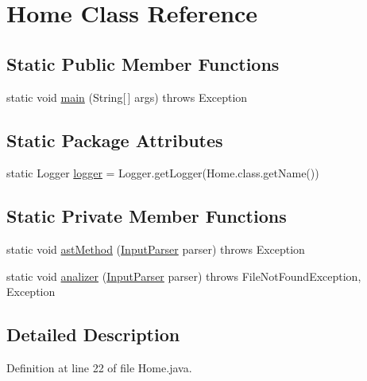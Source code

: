 \hypertarget{class_home}{\section{Home Class Reference}
\label{class_home}
}
\subsection*{Static Public Member Functions}
\begin{DoxyCompactItemize}
\item 
static void \hyperlink{class_home_a824a2d585cb36f1a452ebc5db9b49ed0}{main} (String\mbox{[}$\,$\mbox{]} args)  throws Exception
\end{DoxyCompactItemize}
\subsection*{Static Package Attributes}
\begin{DoxyCompactItemize}
\item 
static Logger \hyperlink{class_home_ac74d97ae59ddf53153a62e8790619756}{logger} = Logger.\-get\-Logger(Home.\-class.\-get\-Name())
\end{DoxyCompactItemize}
\subsection*{Static Private Member Functions}
\begin{DoxyCompactItemize}
\item 
static void \hyperlink{class_home_a6ecba75c6ecc1abdd9c75352d34a7df7}{ast\-Method} (\hyperlink{classinput_parser_1_1_input_parser}{Input\-Parser} parser)  throws Exception 
\item 
static void \hyperlink{class_home_a33f6f6a95fbaf56e713df2a9ec52f5b3}{analizer} (\hyperlink{classinput_parser_1_1_input_parser}{Input\-Parser} parser)  throws File\-Not\-Found\-Exception, Exception 
\end{DoxyCompactItemize}


\subsection{Detailed Description}


Definition at line 22 of file Home.\-java.



